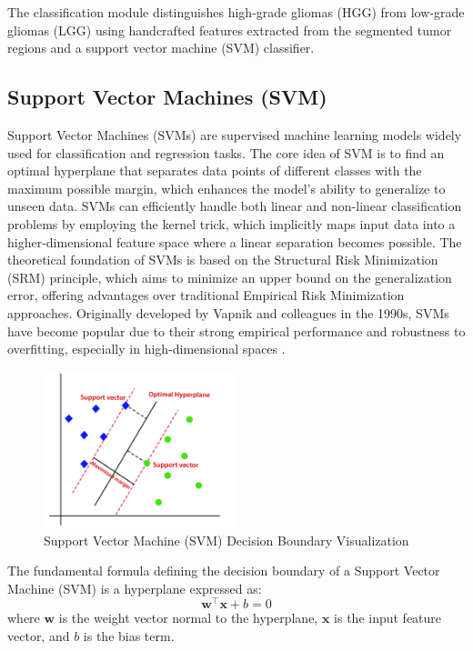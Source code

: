 The classification module distinguishes high‐grade gliomas (HGG) from low‐grade gliomas (LGG) using handcrafted features extracted from the segmented tumor regions and a support vector machine (SVM) classifier.
\subsection{Support Vector Machines (SVM)}
\label{sec:svm}
Support Vector Machines (SVMs) are supervised machine learning models widely used for classification and regression tasks. The core idea of SVM is to find an optimal hyperplane that separates data points of different classes with the maximum possible margin, which enhances the model’s ability to generalize to unseen data. SVMs can efficiently handle both linear and non-linear classification problems by employing the kernel trick, which implicitly maps input data into a higher-dimensional feature space where a linear separation becomes possible. The theoretical foundation of SVMs is based on the Structural Risk Minimization (SRM) principle, which aims to minimize an upper bound on the generalization error, offering advantages over traditional Empirical Risk Minimization approaches. Originally developed by Vapnik and colleagues in the 1990s, SVMs have become popular due to their strong empirical performance and robustness to overfitting, especially in high-dimensional spaces \cite{Gunn1998SupportVM}.
\begin{figure}[H]
  \centering
  \includegraphics[width=0.5\textwidth]{Images/Chapter1/svm.png}
  \caption{Support Vector Machine (SVM) Decision Boundary Visualization}
  \label{fig:svm}
\end{figure}
The fundamental formula defining the decision boundary of a Support Vector Machine (SVM) is a hyperplane expressed as:
\begin{equation}
  \mathbf{w}^\top \mathbf{x} + b = 0
\end{equation}
where $\mathbf{w}$ is the weight vector normal to the hyperplane, $\mathbf{x}$ is the input feature vector, and $b$ is the bias term.

